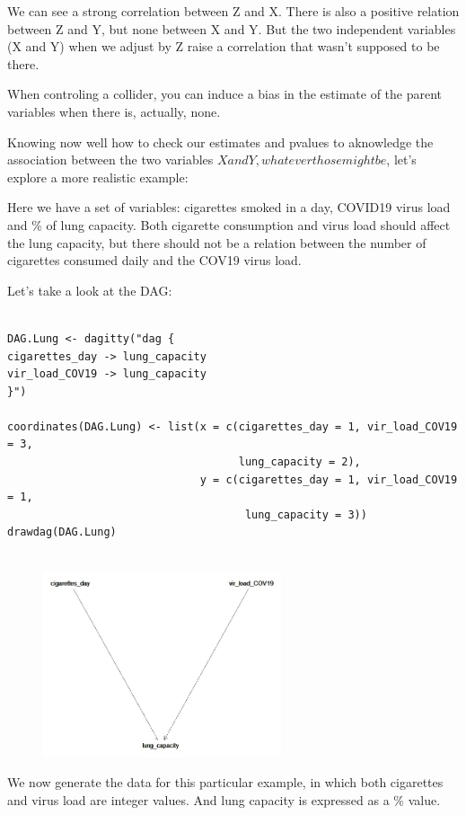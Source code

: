 \documentclass{article}
\begin{document}
We can see a strong correlation between Z and X. There is also a positive
relation between Z and Y, but none between X and Y. But the two independent 
variables (X and Y) when we adjust by Z raise a correlation that wasn't 
supposed to be there.

When controling a collider, you can induce a bias in the estimate of the
parent variables when there is, actually, none.

Knowing now well how to check our estimates and pvalues to aknowledge the 
association between the two variables \(X and Y, whatever those might be\), let's
explore a more realistic example:


Here we have a set of variables: cigarettes smoked in a day, COVID19 virus
load and \% of lung capacity. Both cigarette consumption and virus load should
affect the lung capacity, but there should not be a relation between the 
number of cigarettes consumed daily and the COV19 virus load.

Let's take a look at the DAG:


\begin{lstlisting}

DAG.Lung <- dagitty("dag {
cigarettes_day -> lung_capacity
vir_load_COV19 -> lung_capacity
}")

coordinates(DAG.Lung) <- list(x = c(cigarettes_day = 1, vir_load_COV19 = 3, 
                                    lung_capacity = 2),
                              y = c(cigarettes_day = 1, vir_load_COV19 = 1,
                                     lung_capacity = 3))
drawdag(DAG.Lung)


\end{lstlisting}


\begin{figure}[h]
\includegraphics[width=7cm]{DAG_CIG_LUNG.png}
\centering
\end{figure}


We now generate the data for this particular example, in which both cigarettes
and virus load are integer values. And lung capacity is expressed as a \% value.
\end{document}
